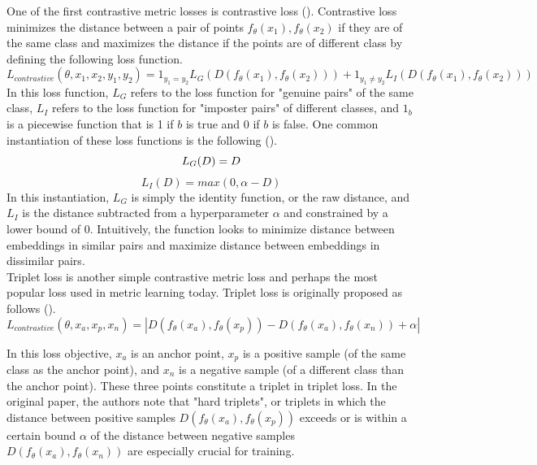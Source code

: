 \documentclass[./dissertation.tex]{subfiles}
\begin{document}
    One of the first contrastive metric losses is contrastive loss (\cite{chopra2005learning}). Contrastive loss minimizes the distance between a pair of points $f_{\theta}(x_{1}), f_{\theta}(x_{2})$ if they are of the same class and maximizes the distance if the points are of different class by defining the following loss function. \\ 
    \begin{equation*}
            L_{contrastive}(\theta, x_{1}, x_{2}, y_{1}, y_{2})
            = 1_{y_{1} = y_{2}}L_{G}(D(f_{\theta}(x_{1}), f_{\theta}(x_{2})))
            + 1_{y_{1} \neq y_{2}}L_{I}(D(f_{\theta}(x_{1}), f_{\theta}(x_{2})))
    \end{equation*}
    In this loss function, $L_{G}$ refers to the loss function for "genuine pairs" of the same class, $L_{I}$ refers to the loss function for "imposter pairs" of different classes, and $1_{b}$ is a piecewise function that is 1 if $b$ is true and 0 if $b$ is false. One common instantiation of these loss functions is the following (\cite{weng2021contrastive}).
    \begin{equation*}
            L_{G}(D) = D \\
    \end{equation*}  
        \begin{equation*}
            L_{I}(D) = max(0, \alpha - D) 
    \end{equation*}  
    In this instantiation, $L_{G}$ is simply the identity function, or the raw distance, and $L_{I}$ is the distance subtracted from a hyperparameter $\alpha$ and constrained by a lower bound of 0. Intuitively, the function looks to minimize distance between embeddings in similar pairs and maximize distance between embeddings in dissimilar pairs. \\
    
    Triplet loss is another simple contrastive metric loss and perhaps the most popular loss used in metric learning today. Triplet loss is originally proposed as follows (\cite{schroff2015facenet}). 
    \begin{equation*}
    L_{contrastive}(\theta, x_{a}, x_{p}, x_{n}) =
    |D(f_{\theta}(x_{a}), f_{\theta}(x_{p})) - D(f_{\theta}(x_{a}), f_{\theta}(x_{n})) + \alpha|
    \end{equation*} 
    
    In this loss objective, $x_{a}$ is an anchor point, $x_{p}$ is a positive sample (of the same class as the anchor point), and  $x_{n}$ is a negative sample (of a different class than the anchor point). These three points constitute a triplet in triplet loss. In the original paper, the authors note that "hard triplets", or triplets in which the distance between positive samples $D(f_{\theta}(x_{a}), f_{\theta}(x_{p}))$ exceeds or is within a certain bound $\alpha$ of the distance between negative samples $D(f_{\theta}(x_{a}), f_{\theta}(x_{n}))$ are especially crucial for training. \\
    
\end{document}
